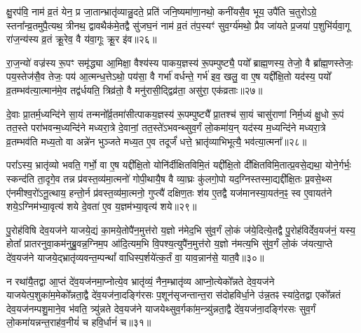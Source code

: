 क्षु॒रप॑वि॒ नाम॑ व्र॒तं येन॒ प्र जा॒तान्भ्रातृ॑व्यान्नु॒दते॒ प्रति॑ जनि॒ष्यमा॑णा॒नथो॒ कनी॑यसै॒व भूय॒ उपै॑ति च॒तुरो\-ऽग्रे॒ स्तना᳚न्व्र॒तमुपै॒त्यथ॒ त्रीनथ॒ द्वावथैक॑मे॒तद्वै सु॑जघ॒नं नाम॑ व्र॒तं त॑प॒स्यꣳ॑ सुव॒र्ग्य॑मथो॒ प्रैव जा॑यते प्र॒जया॑ प॒शुभि॑र्यवा॒गू रा॑ज॒न्य॑स्य व्र॒तं क्रू॒रेव॒ वै य॑वा॒गूः क्रू॒र इ॑व॥२६॥

रा॒ज॒न्यो॑ वज्र॑स्य रू॒पꣳ समृ॑द्ध्या आ॒मिक्षा॒ वैश्य॑स्य पाकय॒ज्ञस्य॑ रू॒पम्पुष्ट्यै॒ पयो᳚ ब्राह्म॒णस्य॒ तेजो॒ वै ब्रा᳚ह्म॒णस्तेजः॒ पय॒स्तेज॑सै॒व तेजः॒ पय॑ आ॒त्मन्ध॒त्ते\-ऽथो॒ पय॑सा॒ वै गर्भा॑ वर्धन्ते॒ गर्भ॑ इव॒ खलु॒ वा ए॒ष यद्दी᳚क्षि॒तो यद॑स्य॒ पयो᳚ व्र॒तम्भव॑त्या॒त्मान॑मे॒व तद्व॑र्धयति॒ त्रिव्र॑तो॒ वै मनु॑रासी॒द्द्विव्र॑ता॒ असु॑रा॒ एक॑व्रताः॥२७॥

दे॒वाः प्रा॒तर्म॒ध्यन्दि॑ने सा॒यं तन्मनो᳚र्व्र॒तमा॑सीत्पाकय॒ज्ञस्य॑ रू॒पम्पुष्ट्यै᳚ प्रा॒तश्च॑ सा॒यं चासु॑राणां निर्म॒ध्यं क्षु॒धो रू॒पं तत॒स्ते परा॑भवन्म॒ध्यन्दि॑ने मध्यरा॒त्रे दे॒वानां॒ तत॒स्ते॑\-ऽभवन्थ्सुव॒र्गं लो॒कमा॑य॒न् यद॑स्य म॒ध्यन्दि॑ने मध्यरा॒त्रे व्र॒तम्भव॑ति मध्य॒तो वा अन्ने॑न भुञ्जते मध्य॒त ए॒व तदूर्जं॑ धत्ते॒ भ्रातृ॑व्याभिभूत्यै॒ भव॑त्या॒त्मना᳚॥२८॥




परा᳚\-ऽस्य॒ भ्रातृ॑व्यो भवति॒ गर्भो॒ वा ए॒ष यद्दी᳚क्षि॒तो योनि॑र्दीक्षितविमि॒तं यद्दी᳚क्षि॒तो दी᳚क्षितविमि॒तात्प्र॒वसे॒द्यथा॒ योने॒र्गर्भः॒ स्कन्द॑ति ता॒दृगे॒व तन्न प्र॑वस्त॒व्य॑मा॒त्मनो॑ गोपी॒थायै॒ष वै व्या॒घ्रः कु॑लगो॒पो यद॒ग्निस्तस्मा॒द्यद्दी᳚क्षि॒तः प्र॒वसे॒थ्स ए॑नमीश्व॒रो॑\-ऽनू॒त्थाय॒ हन्तो॒र्न प्र॑वस्त॒व्य॑मा॒त्मनो॒ गुप्त्यै॑ दक्षिण॒तः श॑य ए॒तद्वै यज॑मानस्या॒यत॑न॒ꣴ॒ स्व ए॒वायत॑ने शये॒\-ऽग्निम॑भ्या॒वृत्य॑ शये दे॒वता॑ ए॒व य॒ज्ञम॑भ्या॒वृत्य॑ शये॥२९॥

{\anuvakamend[{ए॒तद्वै क्रू॒र इ॒वैक॑व्रता आ॒त्मना॒ यज॑मानस्य॒ त्रयो॑दश च}]}%

पु॒रोह॑विषि देव॒यज॑ने याजये॒द्यं का॒मये॒तोपै॑न॒मुत्त॑रो य॒ज्ञो न॑मेद॒भि सु॑व॒र्गं लो॒कं ज॑ये॒दित्ये॒तद्वै पु॒रोह॑विर्देव॒यज॑नं॒ यस्य॒ होता᳚ प्रातरनुवा॒कम॑नुब्रु॒वन्न॒ग्निम॒प आ॑दि॒त्यम॒भि वि॒पश्य॒त्युपै॑न॒मुत्त॑रो य॒ज्ञो न॑मत्य॒भि सु॑व॒र्गं लो॒कं ज॑यत्या॒प्ते दे॑व॒यज॑ने याजये॒द्भ्रातृ॑व्यवन्त॒म्पन्थां᳚ वाधिस्प॒र्\mbox{}शये॑त्क॒र्तं वा॒ याव॒न्नान॑से॒ यात॒वै॥३०॥

न रथा॑यै॒तद्वा आ॒प्तं दे॑व॒यज॑नमा॒प्नोत्ये॒व भ्रातृ॑व्यं॒ नैन॒म्भ्रातृ॑व्य आप्नो॒त्येको᳚न्नते देव॒यज॑ने याजयेत्प॒शुका॑म॒मेको᳚न्नता॒द्वै दे॑व॒यज॑ना॒दङ्गि॑रसः प॒शून॑सृजन्तान्त॒रा स॑दोहविर्धा॒ने उ॑न्न॒तꣴ स्या॑दे॒तद्वा एको᳚न्नतं देव॒यज॑नम्पशु॒माने॒व भ॑वति॒ त्र्यु॑न्नते देव॒यज॑ने याजयेथ्सुव॒र्गका॑म॒न्त्र्यु॑न्नता॒द्वै दे॑व॒यज॑ना॒दङ्गि॑रसः सुव॒र्गं लो॒कमा॑यन्नन्त॒राह॑व॒नीयं॑ च हवि॒र्धानं॑ च॥३१॥


